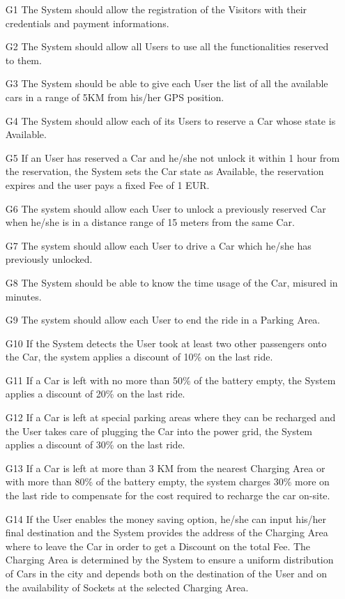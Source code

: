 \begin{enumerate}
	\item[G1] The System should allow the registration of the Visitors with their credentials and payment informations.
	\item[G2] The System should allow all Users to use all the functionalities reserved to them.
	\item[G3] The System should be able to give each User the list of all the available cars in a range of 5KM from his/her GPS position.
	\item[G4] The System should allow each of its Users to reserve a Car whose state is Available.
	\item[G5] If an User has reserved a Car and he/she not unlock it within 1 hour from the reservation, the System sets the Car state as Available, the reservation expires and the user pays a fixed Fee of 1 EUR.  
	\item[G6] The system should allow each User to unlock a previously reserved Car when he/she is in a distance range of 15 meters from the same Car.
	\item[G7] The system should allow each User to drive a Car which he/she has previously unlocked.
	\item[G8] The System should be able to know the time usage of the Car, misured in minutes.
	\item[G9] The system should allow each User to end the ride in a Parking Area.
	\item[G10] If the System detects the User took at least two other passengers onto the Car, the system applies a discount of 10\% on the last ride. 
	\item[G11] If a Car is left with no more than 50\% of the battery empty, the System applies a discount of 20\% on the last ride. 
	\item[G12] If a Car is left at special parking areas where they can be recharged and the User takes care of plugging the Car into the power grid, the System applies a discount of 30\% on the last ride. 
	\item[G13] If a Car is left at more than 3 KM from the nearest Charging Area or with more than 80\% of the battery empty, the system charges 30\% more on the last ride to compensate for the cost required to recharge the car on-site.
	\item[G14] If the User enables the money saving option, he/she can input his/her final destination and the System provides the address of the Charging Area where to leave the Car in order to get a Discount on the total Fee. The Charging Area is determined by the System to ensure a uniform distribution of Cars in the city and depends both on the destination of the User and on the availability of Sockets at the selected Charging Area. 
\end{enumerate}


